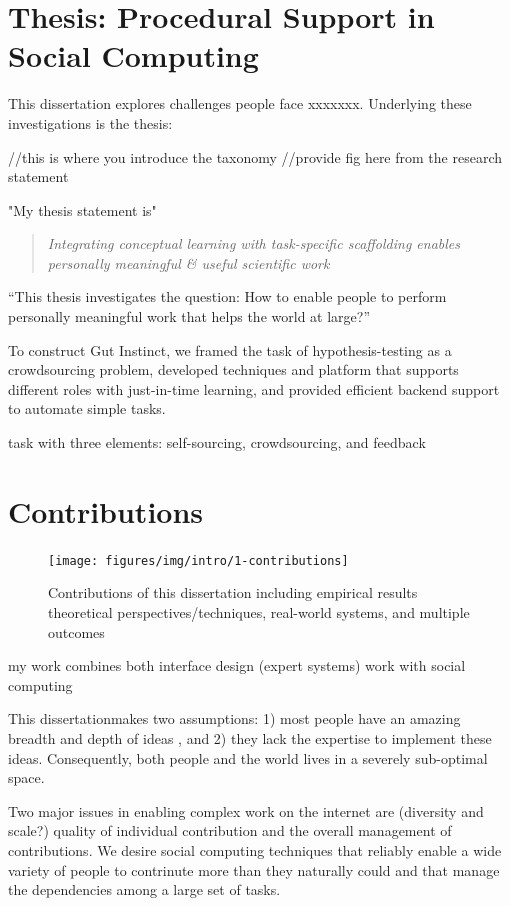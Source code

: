 \section{Thesis: Procedural Support in Social Computing}


This dissertation explores challenges people face xxxxxxx. Underlying these investigations is the thesis:

//this is where you introduce the taxonomy 
//provide fig here from the research statement 

"My thesis statement is"
\begin{quote}
\emph{Integrating conceptual learning with task-specific scaffolding enables personally meaningful \& useful scientific work}
\end{quote}


“This thesis investigates the question: How to enable people to perform personally meaningful work that helps the world at large?”

To construct Gut Instinct, we framed the task of hypothesis-testing as a crowdsourcing problem, developed techniques and platform that supports different roles with just-in-time learning, and provided efficient backend support to automate simple tasks.

task with three elements: self-sourcing, crowdsourcing, and feedback 

\section{Contributions}
\begin{figure}[t!] 
  \centering
    \texttt{[image: figures/img/intro/1-contributions]}
  \caption[Contributions of this dissertation]
{Contributions of this dissertation including empirical results theoretical perspectives/techniques, real-world systems, and multiple outcomes}
  \label{fig:contributions}
\end{figure}

my work combines both interface design (expert systems) work with social computing 

This dissertation\textquotesingle makes two assumptions: 1) most people have an amazing breadth and depth of ideas , and 2) they lack the expertise to implement these ideas. Consequently, both people and the world lives in a severely sub-optimal space.

Two major issues in enabling complex work on the internet are (diversity and scale?) quality of individual contribution and the overall management of contributions.  We desire social computing techniques that reliably enable a wide variety of people to contrinute more than they naturally could and that manage the dependencies among a large set of tasks.

